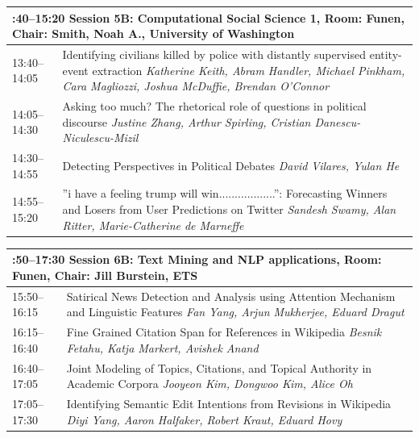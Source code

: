 \documentclass{book}
\renewcommand{\large}{\fontsize{36}{40}\selectfont}
\begin{document}
\begin{tabular}{p{3in}p{16in}}
  \multicolumn{2}{p{\textwidth}}{\bfseries\large 13:40--15:20 Session 5B: Computational Social Science 1, Room:  Funen, Chair:  Smith, Noah A., University of Washington} \\\hline

    
    13:40--14:05
    &	Identifying civilians killed by police with distantly supervised entity-event extraction \newline 
    {\itshape Katherine Keith, Abram Handler, Michael Pinkham, Cara Magliozzi, Joshua McDuffie, Brendan O'Connor} \\
    
    14:05--14:30
    &	Asking too much? The rhetorical role of questions in political discourse \newline 
    {\itshape Justine Zhang, Arthur Spirling, Cristian Danescu-Niculescu-Mizil} \\
    
    14:30--14:55
    &	Detecting Perspectives in Political Debates \newline 
    {\itshape David Vilares, Yulan He} \\
    
    14:55--15:20
    &	''i have a feeling trump will win..................'': Forecasting Winners and Losers from User Predictions on Twitter \newline 
    {\itshape Sandesh Swamy, Alan Ritter, Marie-Catherine de Marneffe} \\
    
\end{tabular}

\begin{tabular}{p{3in}p{16in}}
  \multicolumn{2}{p{\textwidth}}{\bfseries\large 15:50--17:30 Session 6B: Text Mining and NLP applications, Room:  Funen, Chair:  Jill Burstein, ETS} \\\hline

    
    15:50--16:15
    &	Satirical News Detection and Analysis using Attention Mechanism and Linguistic Features \newline 
    {\itshape Fan Yang, Arjun Mukherjee, Eduard Dragut} \\
    
    16:15--16:40
    &	Fine Grained Citation Span for References in Wikipedia \newline 
    {\itshape Besnik Fetahu, Katja Markert, Avishek Anand} \\
    
    16:40--17:05
    &	Joint Modeling of Topics, Citations, and Topical Authority in Academic Corpora \newline 
    {\itshape Jooyeon Kim, Dongwoo Kim, Alice Oh} \\
    
    17:05--17:30
    &	Identifying Semantic Edit Intentions from Revisions in Wikipedia \newline 
    {\itshape Diyi Yang, Aaron Halfaker, Robert Kraut, Eduard Hovy} \\
    
\end{tabular}
\end{document}
